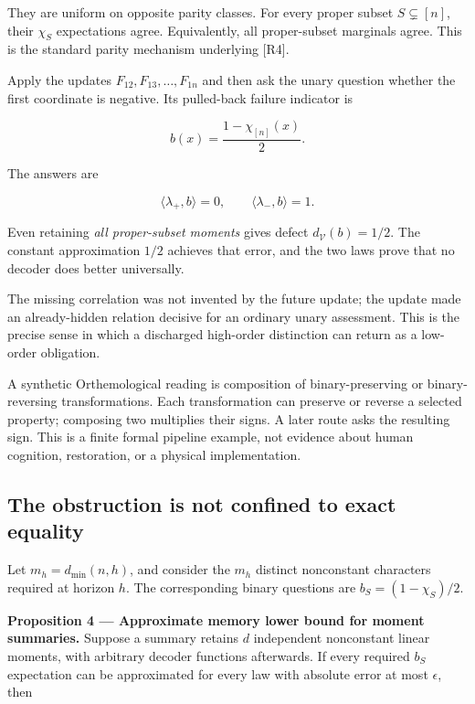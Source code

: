 \documentclass[11pt,a4paper]{article}
\begin{document}
They are uniform on opposite parity classes. For every proper subset
\(S\subsetneq[n]\), their \(\chi_S\) expectations agree. Equivalently,
all proper-subset marginals agree. This is the standard parity mechanism
underlying {[}R4{]}.

Apply the updates \(F_{12},F_{13},\ldots,F_{1n}\) and then ask the unary
question whether the first coordinate is negative. Its pulled-back
failure indicator is

\nopagebreak[4]

\[
b(x)=\frac{1-\chi_{[n]}(x)}2.
\]

The answers are

\nopagebreak[4]

\[
\langle\lambda_+,b\rangle=0,
\qquad
\langle\lambda_-,b\rangle=1.
\]

Even retaining \emph{all proper-subset moments} gives defect
\(d_{\mathscr V}(b)=1/2\). The constant approximation \(1/2\) achieves
that error, and the two laws prove that no decoder does better
universally.

The missing correlation was not invented by the future update; the
update made an already-hidden relation decisive for an ordinary unary
assessment. This is the precise sense in which a discharged high-order
distinction can return as a low-order obligation.

A synthetic Orthemological reading is composition of binary-preserving
or binary-reversing transformations. Each transformation can preserve or
reverse a selected property; composing two multiplies their signs. A
later route asks the resulting sign. This is a finite formal pipeline
example, not evidence about human cognition, restoration, or a physical
implementation.

\subsection{The obstruction is not confined to exact
equality}\label{the-obstruction-is-not-confined-to-exact-equality}

Let \(m_h=d_{\min}(n,h)\), and consider the \(m_h\) distinct nonconstant
characters required at horizon \(h\). The corresponding binary questions
are \(b_S=(1-\chi_S)/2\).


\textbf{Proposition 4 --- Approximate memory lower bound for moment
summaries.} Suppose a summary retains \(d\) independent nonconstant
linear moments, with arbitrary decoder functions afterwards. If every
required \(b_S\) expectation can be approximated for every law with
absolute error at most \(\epsilon\), then
\end{document}
